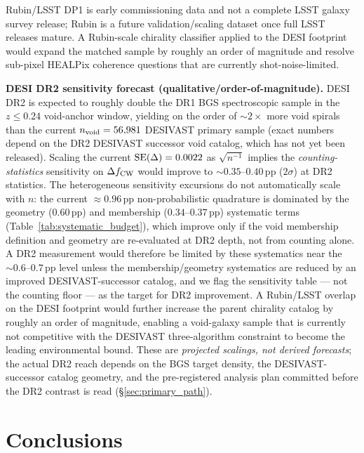 \documentclass[aps,prd,twocolumn,superscriptaddress,showpacs,preprintnumbers,nofootinbib,longbibliography,floatfix]{revtex4-2}
\begin{document}
Rubin/LSST DP1 is early commissioning data and not a complete LSST
galaxy survey release; Rubin is a future validation/scaling dataset
once full LSST releases mature. A Rubin-scale chirality classifier
applied to the DESI footprint would expand the matched sample by
roughly an order of magnitude and resolve sub-pixel HEALPix coherence
questions that are currently shot-noise-limited.

\textbf{DESI DR2 sensitivity forecast (qualitative/order-of-magnitude).}
DESI DR2 is expected to roughly double the DR1 BGS spectroscopic sample in
the $z \leq 0.24$ void-anchor window, yielding on the order of
${\sim}2\!\times$ more void spirals than the current $n_{\rm void} = 56{,}981$
DESIVAST primary sample (exact numbers depend on the DR2 DESIVAST successor
void catalog, which has not yet been released). Scaling the current
${\rm SE}(\Delta) = 0.0022$ as $\sqrt{n^{-1}}$ implies the
\emph{counting-statistics} sensitivity on $\Delta f_{\rm CW}$ would
improve to ${\sim}0.35$--$0.40$\,pp ($2\sigma$) at DR2 statistics.
The heterogeneous sensitivity excursions do not automatically scale
with $n$: the current ${\approx}0.96$\,pp non-probabilistic quadrature is
dominated by the geometry
($0.60$\,pp) and membership ($0.34$--$0.37$\,pp) systematic terms
(Table~\ref{tab:systematic_budget}), which improve only if the void
membership definition and geometry are re-evaluated at DR2 depth, not
from counting alone. A DR2 measurement would therefore be limited by
these systematics near the ${\sim}0.6$--$0.7$\,pp level unless the
membership/geometry systematics are reduced by an improved
DESIVAST-successor catalog, and we flag the sensitivity table --- not
the counting floor --- as the target for DR2 improvement. A Rubin/LSST
overlap on the DESI footprint would further increase the parent chirality
catalog by roughly an order of magnitude, enabling a void-galaxy sample
that is currently not competitive with the DESIVAST three-algorithm
constraint to become the leading environmental bound. These are
\emph{projected scalings, not derived forecasts}; the actual DR2 reach
depends on the BGS target density, the DESIVAST-successor catalog geometry,
and the pre-registered analysis plan committed before the DR2 contrast is
read (\S\ref{sec:primary_path}).

\section{Conclusions}\label{sec:conclusions}
\end{document}
